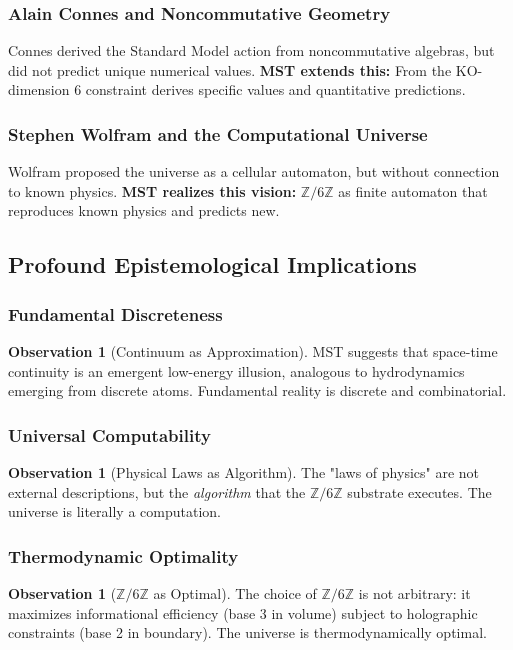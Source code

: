 \documentclass[11pt, a4paper]{article}
\theoremstyle{plain}
\theoremstyle{definition}
\newtheorem{observation}[theorem]{Observation}
\newcommand{\Zmod}{\mathbb{Z}/6\mathbb{Z}}
\begin{document}
\subsubsection{Alain Connes and Noncommutative Geometry}
Connes derived the Standard Model action from noncommutative algebras, but did not predict unique numerical values. \textbf{MST extends this:} From the KO-dimension 6 constraint derives specific values and quantitative predictions.

\subsubsection{Stephen Wolfram and the Computational Universe}
Wolfram proposed the universe as a cellular automaton, but without connection to known physics. \textbf{MST realizes this vision:} $\Zmod$ as finite automaton that reproduces known physics and predicts new.

\subsection{Profound Epistemological Implications}

\subsubsection{Fundamental Discreteness}
\begin{observation}[Continuum as Approximation]
MST suggests that space-time continuity is an emergent low-energy illusion, analogous to hydrodynamics emerging from discrete atoms. Fundamental reality is discrete and combinatorial.
\end{observation}

\subsubsection{Universal Computability}
\begin{observation}[Physical Laws as Algorithm]
The "laws of physics" are not external descriptions, but the \textit{algorithm} that the $\Zmod$ substrate executes. The universe is literally a computation.
\end{observation}

\subsubsection{Thermodynamic Optimality}
\begin{observation}[$\Zmod$ as Optimal]
The choice of $\Zmod$ is not arbitrary: it maximizes informational efficiency (base 3 in volume) subject to holographic constraints (base 2 in boundary). The universe is thermodynamically optimal.
\end{observation}
\end{document}
